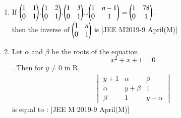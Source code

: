 \documentclass[journal,,12pt,twocolumn]{IEEEtran}
\theoremstyle{remark}
\begin{document}
\begin{enumerate}
\begin{enumerate}
\end{enumerate} 
\item If $\begin{pmatrix}
    1 & 1 \\
    0 & 1
\end{pmatrix}$.$\begin{pmatrix}
    1 & 2 \\
    0 & 1
\end{pmatrix}$.$\begin{pmatrix}
    1 & 3 \\
    0 & 1
\end{pmatrix}$\dots $\begin{pmatrix}
    1 & n-1 \\
    0 & 1
\end{pmatrix}$$=$$\begin{pmatrix}
    1 & 78 \\
    0 & 1
\end{pmatrix}$.\\
then the inverse of $\begin{pmatrix}
    1 & n \\
    0 & 1
\end{pmatrix}$ is 
\hfill{[JEE M2019-9 April(M)]} 
\begin{enumerate}
\end{enumerate}
\item Let $\alpha$ and $\beta$ be the roots of the equation $$x^2+x+1=0$$. Then for $y\ne0$ in R,\\
\begin{align*}\begin{vmatrix}
   y+1 & \alpha & \beta \\
    \alpha & y+\beta & 1 \\
    \beta & 1 & y+\alpha
\end{vmatrix} \end{align*} is equal to : 
\hfill{[JEE M 2019-9 April(M)]} 
\begin{enumerate}
\end{enumerate}

\end{enumerate}
    
\end{document}
